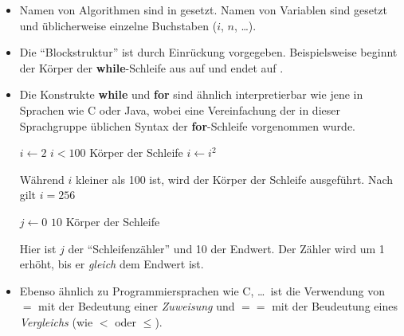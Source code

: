 \begin{itemize}
    \item Namen von Algorithmen sind in  gesetzt. Namen von Variablen sind  gesetzt und üblicherweise einzelne Buchstaben ($i$, $n$, \ldots).

    \item Die \enquote{Blockstruktur} ist durch Einrückung vorgegeben. Beispielsweise beginnt der Körper der \textbf{while}-Schleife aus  auf  und endet auf .
    
    \item Die Konstrukte \textbf{while} und \textbf{for} sind ähnlich interpretierbar wie jene in Sprachen wie C oder Java, wobei eine Vereinfachung der in dieser Sprachgruppe üblichen Syntax der \textbf{for}-Schleife vorgenommen wurde.

    \begin{minipage}[t]{0.48\linewidth}
        \begin{codebox}
            \li $i \gets 2$
            \li \While $i < 100$
            \li     \Do
                        \Comment Körper der Schleife
            \li         $i \gets i^2$
            \li     \End                            \label{ln:pseudocode-example-while-end}
        \end{codebox}
        
        Während $i$ kleiner als 100 ist, wird der Körper der Schleife ausgeführt. Nach  gilt $i = 256$ 
    \end{minipage}
    \hfill
    \begin{minipage}[t]{0.48\linewidth}
        \begin{codebox}
            \li \For $j \gets 0$ \To $10$
            \li     \Do
                        \Comment Körper der Schleife
                    \End
        \end{codebox}

        Hier ist $j$ der \enquote{Schleifenzähler} und 10 der Endwert. Der Zähler wird um 1 erhöht, bis er \emph{gleich} dem Endwert ist.
    \end{minipage}

    \item Ebenso ähnlich zu Programmiersprachen wie C, \ldots\ ist die Verwendung von $=$ mit der Bedeutung einer \emph{Zuweisung} und $==$ mit der Beudeutung eines \emph{Vergleichs} (wie $<$ oder $\leq$).


\end{itemize}
